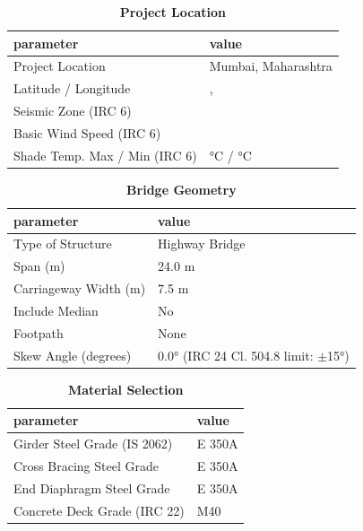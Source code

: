 \documentclass[12pt,a4paper]{report}
\numberwithin{table}{chapter}
\numberwithin{figure}{chapter}
\begin{document}
\begin{table}[H]
\caption{\textbf{Project Location}}
\label{subsec:project-location}
\begin{tabular}{|L{5.5cm}|L{8.5cm}|}
\hline
\textbf{parameter} & \textbf{value} \\
\hline
\textnormal{Project Location} & Mumbai, Maharashtra \\
\hline
\textnormal{Latitude / Longitude} & ,  \\
\hline
\textnormal{Seismic Zone (IRC 6)} &  \\
\hline
\textnormal{Basic Wind Speed (IRC 6)} &  \\
\hline
\textnormal{Shade Temp. Max / Min (IRC 6)} &  °C /  °C \\
\hline
\end{tabular}
\vspace{0.4cm}
\end{table}

\begin{table}[H]
\caption{\textbf{Bridge Geometry}}
\label{subsec:bridge-geometry}
\begin{tabular}{|L{5.5cm}|L{8.5cm}|}
\hline
\textbf{parameter} & \textbf{value} \\
\hline
\textnormal{Type of Structure} & Highway Bridge \\
\hline
\textnormal{Span (m)} & 24.0 m \\
\hline
\textnormal{Carriageway Width (m)} & 7.5 m \\
\hline
\textnormal{Include Median} & No \\
\hline
\textnormal{Footpath} & None \\
\hline
\textnormal{Skew Angle (degrees)} & 0.0° (IRC 24 Cl. 504.8 limit: $\pm$15°) \\
\hline
\end{tabular}
\end{table}
\vspace{0.4cm}

\begin{table}[H]
\caption{\textbf{Material Selection}}
\label{subsec:material}
\begin{tabular}{|L{5.5cm}|L{8.5cm}|}
\hline
\textbf{parameter} & \textbf{value} \\
\hline
\textnormal{Girder Steel Grade (IS 2062)} & E 350A \\
\hline
\textnormal{Cross Bracing Steel Grade} & E 350A \\
\hline
\textnormal{End Diaphragm Steel Grade} & E 350A \\
\hline
\textnormal{Concrete Deck Grade (IRC 22)} & M40 \\
\hline
\end{tabular}
\end{table}
\vspace{0.4cm}
\end{document}
